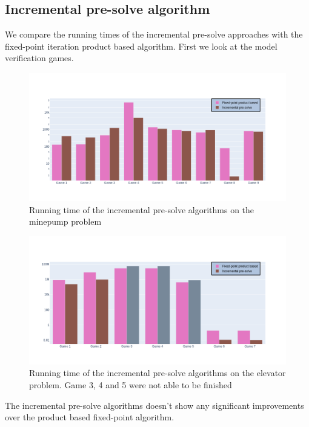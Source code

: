\subsection{Incremental pre-solve algorithm}
We compare the running times of the incremental pre-solve approaches with the fixed-point iteration product based algorithm. First we look at the model verification games.
\begin{figure}[H]
	\includegraphics[width=1\linewidth]{"results/minepump/Fixed-point product based_Incremental pre-solve_"}
	\caption{Running time of the incremental pre-solve algorithms on the minepump problem}
	\label{fig:minepumpzlnks}
\end{figure}%
\begin{figure}[H]
	\includegraphics[width=1\linewidth]{"results/elevator/Fixed-point product based_Incremental pre-solve_"}
	\caption{Running time of the incremental pre-solve algorithms on the elevator problem. Game 3, 4 and 5 were not able to be finished }
	\label{fig:elevatorzlnks}
\end{figure}%
The incremental pre-solve algorithms doesn't show any significant improvements over the product based fixed-point algorithm.

